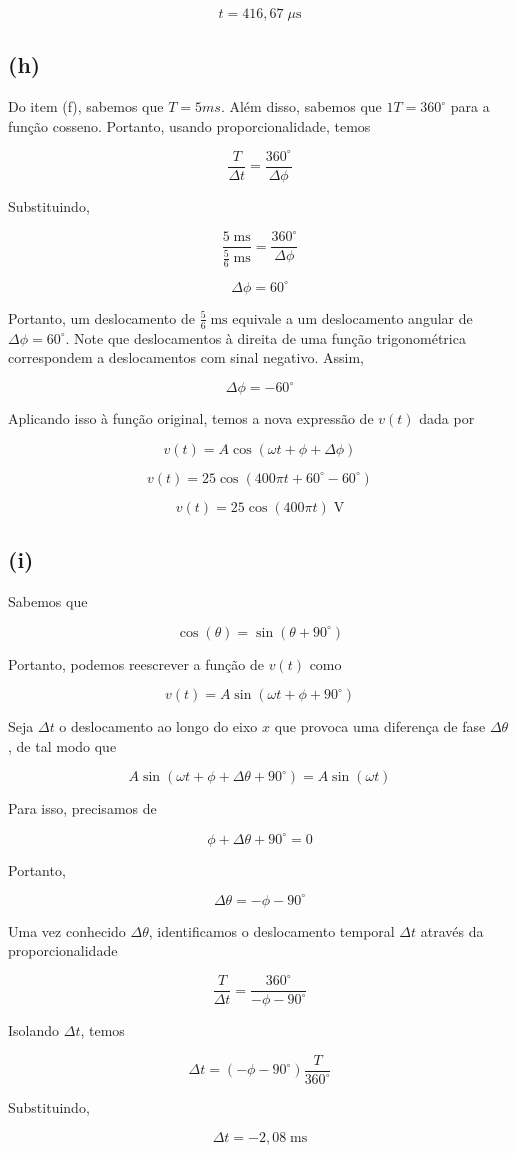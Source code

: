 \[ \boxed{t = 416,67 \;\mu\textrm{s}}  \]

\subsection*{(h)}

Do item (f), sabemos que $T=5ms$. Além disso, sabemos que $1T=360^{\circ}$ para a função cosseno. 
Portanto, usando proporcionalidade, temos

\[ \frac{T}{\Delta t} = \frac{360^{\circ}}{\Delta \phi}  \]

Substituindo,

\[ \frac{5 \;\textrm{ms}}{\frac{5}{6} \;\textrm{ms}} = \frac{360^{\circ}}{\Delta \phi}  \]

\[ \Delta \phi = 60^{\circ}  \]

Portanto, um deslocamento de $\frac{5}{6} \;\textrm{ms}$ equivale a um deslocamento angular de $\Delta \phi = 60^{\circ}$.
Note que deslocamentos à direita de uma função trigonométrica correspondem a deslocamentos com sinal negativo. Assim, 

\[ \Delta \phi = -60^{\circ}  \]

Aplicando isso à função original, temos a nova expressão de $v(t)$ dada por

\[ v(t) = A\cos\left(\omega t + \phi + \Delta \phi\right) \]

\[ v(t) = 25\cos\left(400\pi t + 60^{\circ} - 60^{\circ}\right) \]

\[ \boxed{v(t) = 25\cos\left(400\pi t\right)  \;\textrm{V}}  \]

\subsection*{(i)}

Sabemos que

\[ \cos(\theta) = \sin(\theta + 90^{\circ}) \]

Portanto, podemos reescrever a função de $v(t)$ como

\[ v(t) = A\sin\left(\omega t + \phi + 90^{\circ}\right)  \]

Seja $\Delta t$ o deslocamento ao longo do eixo $x$ que provoca uma diferença de fase $\Delta\theta$, de tal modo que

\[ A\sin\left(\omega t + \phi + \Delta\theta + 90^{\circ}\right) =  A\sin\left(\omega t\right)  \]

Para isso, precisamos de

\[ \phi + \Delta\theta + 90^{\circ} = 0 \]

Portanto,

\[ \Delta\theta = - \phi - 90^{\circ} \]

Uma vez conhecido $\Delta\theta$, identificamos o deslocamento temporal $\Delta t$ através da proporcionalidade

\[ \frac{T}{\Delta t} = \frac{360^{\circ}}{- \phi - 90^{\circ}}  \]

Isolando $\Delta t$, temos

\[ \Delta t = (- \phi - 90^{\circ}) \frac{T}{360^{\circ}} \]

Substituindo,

\[ \boxed{\Delta t = - 2,08\;\textrm{ms}}  \]

